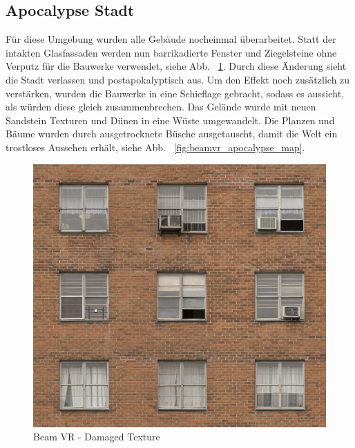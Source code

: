 \subsection{Apocalypse Stadt}\label{subsec:apocalypse-city}
F\"ur diese Umgebung wurden alle Geb\"aude nocheinmal \"uberarbeitet.
Statt der intakten Glasfassaden werden nun barrikadierte Fenster und Ziegelsteine ohne Verputz f\"ur die Bauwerke verwendet, siehe Abb. ~\ref{fig:beamvr_damaged_texture}.
Durch diese \"Anderung sieht die Stadt verlassen und postapokalyptisch aus.
Um den Effekt noch zus\"atzlich zu verst\"arken, wurden die Bauwerke in eine Schieflage gebracht, sodass es aussieht, als w\"urden diese gleich zusammenbrechen.
Das Gel\"ande wurde mit neuen Sandstein Texturen und D\"unen in eine W\"uste umgewandelt.
Die Planzen und B\"aume wurden durch ausgetrocknete B\"usche ausgetauscht, damit die Welt ein trostloses Aussehen erhält, siehe Abb. ~\ref{fig:beamvr_apocalypse_map}.

\begin {figure}
    \centering
    \includegraphics{pics/beamvr_damaged_texture}
    \caption{Beam VR - Damaged Texture}
    \label{fig:beamvr_damaged_texture}
\end {figure}

